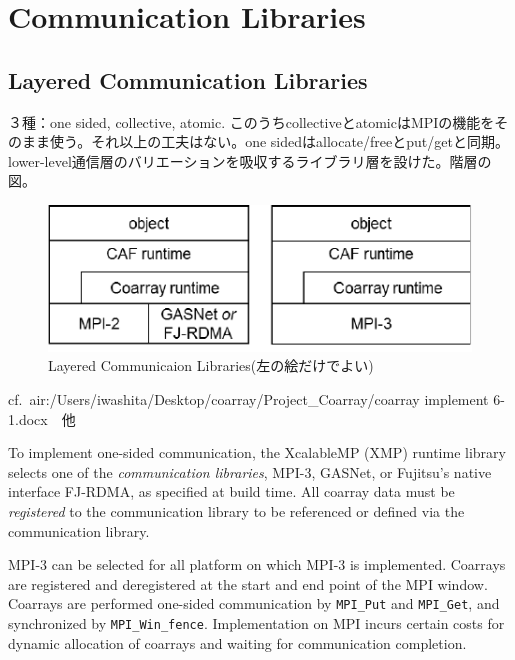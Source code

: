 \section{Communication Libraries}\label{sec:runtime}

\subsection{Layered Communication Libraries}

３種：one sided, collective, atomic. このうちcollectiveとatomicはMPIの機能をそのまま使う。それ以上の工夫はない。one sidedはallocate/freeとput/getと同期。lower-level通信層のバリエーションを吸収するライブラリ層を設けた。階層の図。

\begin{figure}[tbh]
  \begin{center}
  \includegraphics[scale=1.0]{figs/layer.pdf}
  \caption{Layered Communicaion Libraries(左の絵だけでよい)}\label{fig:layer}
  \end{center}
\end{figure}

cf.\ air:/Users/iwashita/Desktop/coarray/Project\_Coarray/coarray implement 6-1.docx　他


To implement one-sided communication, the XcalableMP (XMP) runtime library selects one of the 
{\em communication libraries}, MPI-3, GASNet, or Fujitsu’s native interface FJ-RDMA, 
as specified at build time. All coarray data must be {\em registered} to the communication 
library to be referenced or defined via the communication library.

MPI-3 can be selected for all platform on which MPI-3 is implemented. Coarrays are 
registered and deregistered at the start and end point of the MPI window. 
Coarrays are performed one-sided communication by {\tt MPI_Put} and {\tt MPI_Get}, 
and synchronized by {\tt MPI_Win_fence}. 
Implementation on MPI incurs certain costs for dynamic allocation of coarrays and 
waiting for communication completion.

